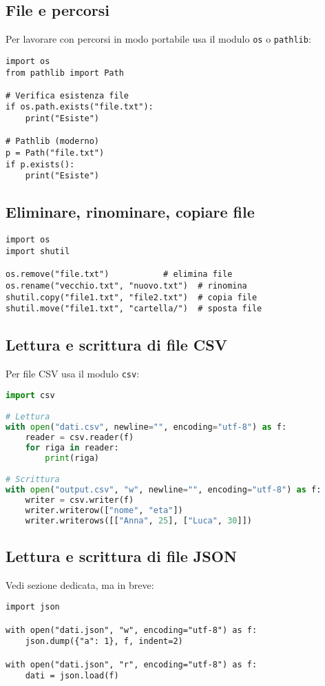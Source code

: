 \documentclass[a4paper,12pt]{article}
\begin{document}
\subsection*{File e percorsi}
Per lavorare con percorsi in modo portabile usa il modulo \texttt{os} o \texttt{pathlib}:
\begin{lstlisting}
import os
from pathlib import Path

# Verifica esistenza file
if os.path.exists("file.txt"):
    print("Esiste")

# Pathlib (moderno)
p = Path("file.txt")
if p.exists():
    print("Esiste")
\end{lstlisting}

\subsection*{Eliminare, rinominare, copiare file}
\begin{lstlisting}
import os
import shutil

os.remove("file.txt")           # elimina file
os.rename("vecchio.txt", "nuovo.txt")  # rinomina
shutil.copy("file1.txt", "file2.txt")  # copia file
shutil.move("file1.txt", "cartella/")  # sposta file
\end{lstlisting}

\subsection*{Lettura e scrittura di file CSV}
Per file CSV usa il modulo \texttt{csv}:
\begin{lstlisting}[language=Python, basicstyle=\ttfamily\footnotesize, breaklines=true, frame=single]
import csv

# Lettura
with open("dati.csv", newline="", encoding="utf-8") as f:
    reader = csv.reader(f)
    for riga in reader:
        print(riga)

# Scrittura
with open("output.csv", "w", newline="", encoding="utf-8") as f:
    writer = csv.writer(f)
    writer.writerow(["nome", "eta"])
    writer.writerows([["Anna", 25], ["Luca", 30]])
\end{lstlisting}

\subsection*{Lettura e scrittura di file JSON}
Vedi sezione dedicata, ma in breve:
\begin{lstlisting}
import json

with open("dati.json", "w", encoding="utf-8") as f:
    json.dump({"a": 1}, f, indent=2)

with open("dati.json", "r", encoding="utf-8") as f:
    dati = json.load(f)
\end{lstlisting}
\end{document}
